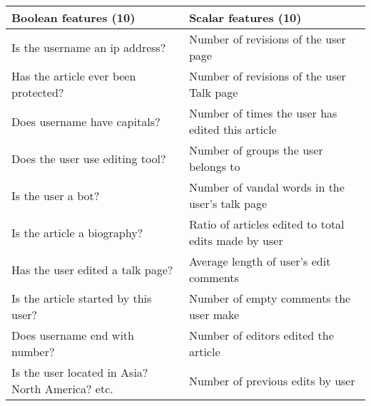 \begin{tabular}{l|l}\hline
\textbf{Boolean features (10)} & \textbf{Scalar features (10)}\\
\hline
\hline
Is the username an ip address? & Number of revisions of the user page \\
Has the article ever been protected? & Number of revisions of the user Talk page \\
Does username have capitals? & Number of times the user has edited this article \\
Does the user use editing tool? & Number of groups the user belongs to \\
Is the user a bot? & Number of vandal words in the user's talk page \\
Is the article a biography? & Ratio of articles edited to total edits made by user \\
Has the user edited a talk page? & Average length of user's edit comments \\
Is the article started by this user? & Number of empty comments the user make \\
Does username end with number? & Number of editors edited the article \\
Is the user located in Asia? North America? etc. & Number of previous edits by user \\
\hline
\end{tabular}
